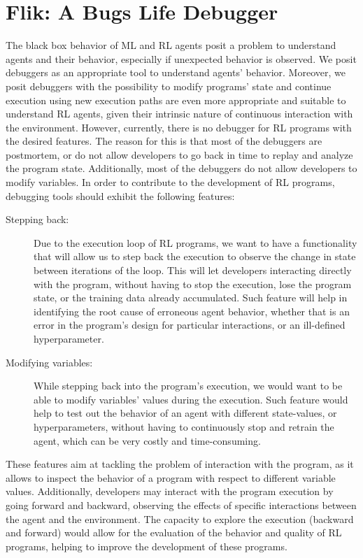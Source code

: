 
\section{Flik: A Bugs Life Debugger}
\label{sec:solution}

The black box behavior of \ac{ML} and \ac{RL} agents posit a problem to understand agents and 
their behavior, especially if unexpected behavior is observed. We posit debuggers as an appropriate 
tool to understand agents' behavior. Moreover, we posit debuggers with the possibility to modify 
programs' state and continue execution using new execution paths are even more appropriate and 
suitable to understand \ac{RL} agents, given their intrinsic nature of continuous interaction with the 
environment. However, currently, there is no debugger for \ac{RL} programs with the desired 
features. The reason for this is that most of the debuggers are postmortem, or do not allow developers
to go back in time to replay and analyze the program state. Additionally, most of the debuggers do not 
allow developers to modify variables. In order to contribute to the development of \ac{RL} programs, 
debugging tools should exhibit the following features:

\begin{description}
    \item[Stepping back:] Due to the execution loop of \ac{RL} programs, we 
    want to have a functionality that will allow us to step back the execution to observe the change 
    in state between iterations of the loop. This will let developers interacting directly with the program, 
    without having to stop the execution,  lose the program state, or the training data already 
    accumulated. Such feature will help in identifying the root cause of erroneous agent behavior, 
    whether that is an error in the program's design for particular interactions, or an ill-defined 
    hyperparameter. 
    \item [Modifying variables:] While stepping back into the program's execution, we would want to be 
    able to modify variables' values during the execution. Such feature would help to test out the 
    behavior of an agent with different state-values, or hyperparameters, without having to 
    continuously stop and retrain the agent, which can be very costly and time-consuming. 
\end{description}

These features aim at tackling the problem of interaction with the program, as it allows 
to inspect the behavior of a program with respect to different variable values. Additionally, 
developers may interact with the program execution by going forward and backward, observing the 
effects of specific interactions between the agent and the environment. The capacity to explore the 
execution (backward and forward) would allow for the evaluation of the behavior and quality of 
\ac{RL} programs, helping to improve the development of these programs.

